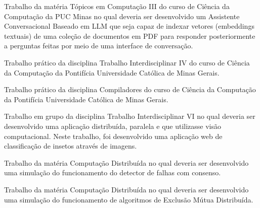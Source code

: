 
Trabalho da matéria Tópicos em Computação III do curso de Ciência da Computação da PUC Minas no qual deveria ser desenvolvido um Assistente Conversacional Baseado em LLM que seja capaz de indexar vetores (embeddings textuais) de uma coleção de documentos em PDF para responder posteriormente a perguntas feitas por meio de uma interface de conversação.\\
\divider

Trabalho prático da disciplina Trabalho Interdisciplinar IV do curso de Ciência da Computação da Pontifícia Universidade Católica de Minas Gerais.\\
\divider

Trabalho prático da disciplina Compiladores do curso de Ciência da Computação da Pontifícia Universidade Católica de Minas Gerais.\\
\divider

Trabalho em grupo da disciplina Trabalho Interdisciplinar VI no qual deveria ser desenvolvido uma aplicação distribuída, paralela e que utilizasse visão computacional. Neste trabalho, foi desenvolvido uma aplicação web de classificação de insetos através de imagens.\\
\divider

Trabalho da matéria Computação Distribuída no qual deveria ser desenvolvido uma simulação do funcionamento do detector de falhas com consenso.\\
\divider

Trabalho da matéria Computação Distribuída no qual deveria ser desenvolvido uma simulação do funcionamento de algoritmos de Exclusão Mútua Distribuída.\\
\divider

